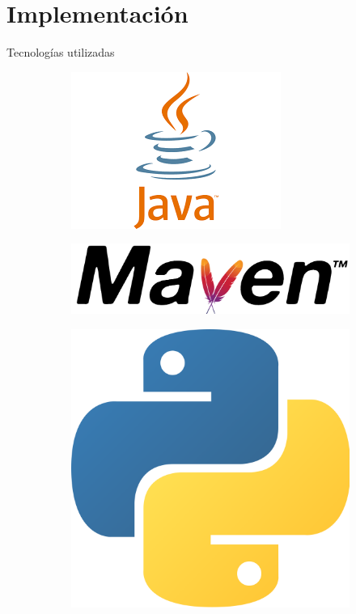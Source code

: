 \documentclass[11pt]{beamer}    %
\begin{document}
    \section{Implementación}

    \begin{frame}{Tecnologías utilizadas}
        \begin{figure}
            \centering
            \begin{subfigure}[t]{0.33\textwidth}
                \centering
                \includegraphics[scale=1]{img/presentation/java}
            \end{subfigure}%
            \begin{subfigure}[t]{0.33\textwidth}
                \centering
                \includegraphics[scale=0.05]{img/presentation/maven}
            \end{subfigure}%
            \begin{subfigure}[t]{0.33\textwidth}
                \centering
                \includegraphics[scale=0.03]{img/presentation/python}

\end{subfigure}
\end{figure}
\end{frame}
\end{document}

